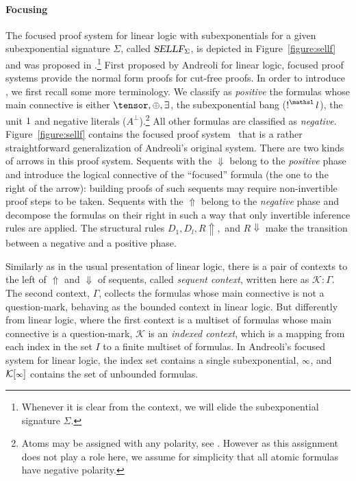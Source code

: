 \paragraph{Focusing} The focused proof system for linear logic with
subexponentials for a given subexponential signature
$\Sigma$, called $\hbox{\sl SELLF}_\Sigma$, is
depicted in Figure~\ref{figure:sellf}
and was proposed in \cite{nigam09ppdp}.\footnote{Whenever it is clear from
the context, we will elide the
subexponential signature
$\Sigma$.}
First proposed by Andreoli \cite{andreoli92jlc} for linear logic,
focused proof systems provide the normal form proofs for cut-free proofs.
In order to introduce \sellf, we first recall some more terminology. 
We classify as
\emph{positive} the formulas whose main connective is either $\tensor,
\plus, \exists$, the subexponential bang ($\nbang{l}$), the unit $1$ and
negative literals ($A^\bot$).\footnote{Atoms may be assigned with any
polarity, see \cite{andreoli92jlc,nigam10jar}. However as this assignment
does not play a role here, we assume for simplicity that all atomic
formulas have negative polarity.} All other formulas are classified as
\emph{negative}. Figure~\ref{figure:sellf} contains the focused proof
system \sellf\ that
is a rather straightforward generalization of Andreoli's original
system. There are two kinds of arrows in this proof system. Sequents
with the $\Downarrow$ belong to the \emph{positive} phase and introduce
the logical connective of the ``focused'' formula (the one to the right
of the arrow): building proofs of such sequents may require
non-invertible proof steps to be taken.  Sequents with the $\Uparrow$
belong to the \emph{negative} phase and 
decompose the formulas on their right in such a way that only
invertible inference rules are applied. The structural 
rules $D_1, D_l, R\Uparrow,$ and
$R \Downarrow$ make the transition between a negative and a positive
phase. 

Similarly as in the usual presentation of linear logic, there is a pair
of contexts to the left of $\Uparrow$ and $\Downarrow$ of
sequents, called \emph{sequent context}, written here as $\mathcal{K}:
\Gamma$. 
The second context, $\Gamma$, collects the formulas whose main
connective is not a question-mark, behaving as the bounded context
in linear logic. But differently from linear logic, where the first
context is a multiset of formulas whose main connective is a
question-mark, $\mathcal{K}$ is an \emph{indexed context}, which is a
mapping from each index in the set $I$ to a finite multiset of formulas. In
Andreoli's focused system for linear
logic, the index set contains a single subexponential, ${\scriptstyle\infty}$, and
$\mathcal{K}[{\scriptstyle\infty}]$ contains the set of unbounded formulas.

